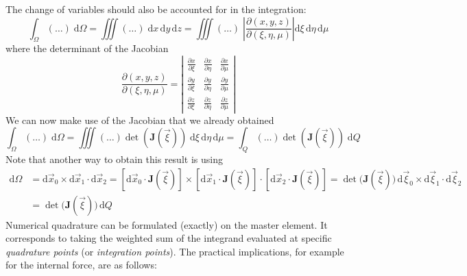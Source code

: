 \documentclass[times,namecite]{goose-article}
\begin{document}
The change of variables should also be accounted for in the integration:
\begin{equation}
  \int_\Omega (\ldots) \; \mathrm{d} \Omega
  =
  \iiint (\ldots) \; \mathrm{d} x \, \mathrm{d} y \, \mathrm{d} z
  =
  \iiint (\ldots) \; \left| \frac{\partial \left( x, y, z \right)}{\partial \left( \xi, \eta, \mu \right)} \right| \mathrm{d} \xi \, \mathrm{d} \eta \, \mathrm{d} \mu
\end{equation}
where the determinant of the Jacobian
\begin{equation}
  \frac{\partial \left( x, y, z \right)}{\partial \left( \xi, \eta, \mu \right)}
  =
  \left|
    \begin{array}{ccc}
      \displaystyle \frac{\partial x}{\partial \xi } &
      \displaystyle \frac{\partial x}{\partial \eta} &
      \displaystyle \frac{\partial x}{\partial \mu }
      \\
      \displaystyle \frac{\partial y}{\partial \xi } &
      \displaystyle \frac{\partial y}{\partial \eta} &
      \displaystyle \frac{\partial y}{\partial \mu }
      \\
      \displaystyle \frac{\partial z}{\partial \xi } &
      \displaystyle \frac{\partial z}{\partial \eta} &
      \displaystyle \frac{\partial z}{\partial \mu }
    \end{array}
  \right|
\end{equation}
We can now make use of the Jacobian that we already obtained
\begin{equation}
  \int_\Omega (\ldots) \; \mathrm{d} \Omega
  =
  \iiint (\ldots) \det \left( \bm{J}(\vec{\xi}) \right) \; \mathrm{d} \xi \, \mathrm{d} \eta \, \mathrm{d} \mu
  =
  \int_Q (\ldots) \det \left( \bm{J}(\vec{\xi}) \right) \; \mathrm{d} Q
\end{equation}
Note that another way to obtain this result is using
\begin{align}
  \mathrm{d} \Omega
  &=
  \mathrm{d} \vec{x}_0 \times \mathrm{d} \vec{x}_1 \cdot \mathrm{d} \vec{x}_2
  =
  \left[ \mathrm{d} \vec{x}_0 \cdot \bm{J}(\vec{\xi}) \right] \times
  \left[ \mathrm{d} \vec{x}_1 \cdot \bm{J}(\vec{\xi}) \right] \cdot
  \left[ \mathrm{d} \vec{x}_2 \cdot \bm{J}(\vec{\xi}) \right]
  =
  \det \big( \bm{J}(\vec{\xi}) \big)\,
  \mathrm{d} \vec{\xi}_0 \times \mathrm{d} \vec{\xi}_1 \cdot \mathrm{d} \vec{\xi}_2
  \\
  &=
  \det \big( \bm{J}(\vec{\xi}) \big)\, \mathrm{d} Q
\end{align}
Numerical quadrature can be formulated (exactly) on the master element. It corresponds to taking the weighted sum of the integrand evaluated at specific \emph{quadrature points} (or \emph{integration points}). The practical implications, for example for the internal force, are as follows:
\end{document}
